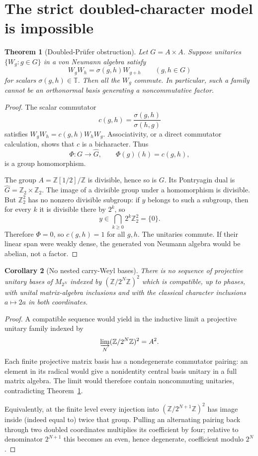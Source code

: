 \documentclass[11pt]{article}
\newtheorem{theorem}{Theorem}
\newtheorem{corollary}[theorem]{Corollary}
\theoremstyle{definition}
\theoremstyle{remark}
\newcommand{\T}{\mathbb T}
\newcommand{\Z}{\mathbb Z}
\newcommand{\1}{\mathbf 1}
\begin{document}
\section{The strict doubled-character model is impossible}

\begin{theorem}[Doubled-Pr\"ufer obstruction]\label{thm:nogo}
Let $G=A\times A$.  Suppose unitaries $\{W_g:g\in G\}$ in a von Neumann
algebra satisfy
\[
 W_gW_h=\sigma(g,h)W_{g+h}\qquad(g,h\in G)
\]
for scalars $\sigma(g,h)\in\T$.  Then all the $W_g$ commute.  In particular,
such a family cannot be an orthonormal basis generating a noncommutative
factor.
\end{theorem}

\begin{proof}
The scalar commutator
\[
 c(g,h)=\frac{\sigma(g,h)}{\sigma(h,g)}
\]
satisfies $W_gW_h=c(g,h)W_hW_g$.  Associativity, or a direct commutator
calculation, shows that $c$ is a bicharacter.  Thus
\[
 \Phi:G\longrightarrow\widehat G,\qquad
 \Phi(g)(h)=c(g,h),
\]
is a group homomorphism.

The group $A=\Z[1/2]/\Z$ is divisible, hence so is $G$.  Its Pontryagin dual
is $\widehat G=\Z_2\times\Z_2$.  The image of a divisible group under a
homomorphism is divisible.  But $\Z_2^2$ has no nonzero divisible subgroup:
if $y$ belongs to such a subgroup, then for every $k$ it is divisible there
by $2^k$, so
\[
 y\in\bigcap_{k\ge0}2^k\Z_2^2=\{0\}.
\]
Therefore $\Phi=0$, so $c(g,h)=1$ for all $g,h$.  The unitaries commute.  If
their linear span were weakly dense, the generated von Neumann algebra would
be abelian, not a factor.
\end{proof}

\begin{corollary}[No nested carry-Weyl bases]\label{cor:finite}
There is no sequence of projective unitary bases of
$M_{2^N}$ indexed by $(\Z/2^N\Z)^2$ which is compatible, up to phases, with
unital matrix-algebra inclusions and with the classical character inclusions
$a\mapsto2a$ in both coordinates.
\end{corollary}

\begin{proof}
A compatible sequence would yield in the inductive limit a projective unitary
family indexed by
\[
 \varinjlim_N(\Z/2^N\Z)^2=A^2.
\]
Each finite projective matrix basis has a nondegenerate commutator pairing:
an element in its radical would give a nonidentity central basis unitary in a
full matrix algebra.  The limit would therefore contain noncommuting
unitaries, contradicting Theorem~\ref{thm:nogo}.

Equivalently, at the finite level every injection into
$(\Z/2^{N+1}\Z)^2$ has image inside (indeed equal to) twice that group.
Pulling an alternating pairing back through two doubled coordinates multiplies
its coefficient by four; relative to denominator $2^{N+1}$ this becomes an
even, hence degenerate, coefficient modulo $2^N$.
\end{proof}
\end{document}
